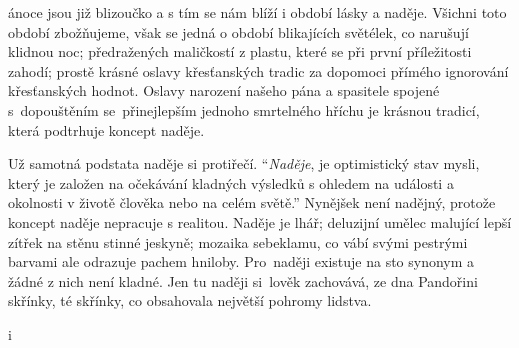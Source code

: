 \documentclass{article}
\begin{document}

ánoce jsou již blizoučko a s tím se nám blíží i období lásky a naděje.
Všichni toto období zbožňujeme, však se jedná o období blikajících světélek, co narušují klidnou noc;
předražených maličkostí z plastu, které se při první příležitosti zahodí;
prostě krásné oslavy křesťanských tradic za dopomoci přímého ignorování křesťanských hodnot.
Oslavy narození našeho pána a spasitele spojené s~dopouštěním se~přinejlepším jednoho smrtelného hříchu je krásnou tradicí, která podtrhuje koncept naděje. \par
Už samotná podstata naděje si protiřečí.
\enquote{\textit{Naděje}, je optimistický stav mysli, který je založen na očekávání kladných výsledků s ohledem na události a okolnosti v životě člověka nebo na celém světě.}
Nynějšek není nadějný, protože koncept naděje nepracuje s realitou.
Naděje je lhář;
deluzijní umělec malující lepší zítřek na stěnu stinné jeskyně;
mozaika sebeklamu, co vábí svými pestrými barvami ale odrazuje pachem hniloby.
Pro~naději existuje na sto synonym a žádné z nich není kladné.
Jen tu naději si~lověk zachovává, ze dna Pandořini skřínky, té skřínky, co obsahovala největší pohromy lidstva. \par

\newpage

i
\end{document}
